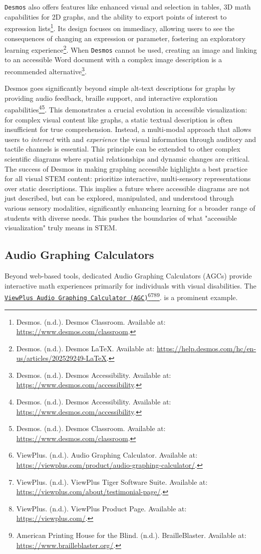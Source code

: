 \texttt{Desmos} also offers features like enhanced visual and selection in tables, 3D math capabilities for 2D graphs, and the ability to export points of interest to expression lists\footnote{Desmos. (n.d.). Desmos Classroom. Available at: \url{https://www.desmos.com/classroom}.}. Its design focuses on immediacy, allowing users to see the consequences of changing an expression or parameter, fostering an exploratory learning experience\footnote{Desmos. (n.d.). Desmos LaTeX. Available at: \url{https://help.desmos.com/hc/en-us/articles/202529249-LaTeX}.}. When \texttt{Desmos} cannot be used, creating an image and linking to an accessible Word document with a complex image description is a recommended alternative\footnote{Desmos. (n.d.). Desmos Accessibility. Available at: \url{https://www.desmos.com/accessibility}.}.

Desmos goes significantly beyond simple alt-text descriptions for graphs by providing audio feedback, braille support, and interactive exploration capabilities\footnote{Desmos. (n.d.). Desmos Accessibility. Available at: \url{https://www.desmos.com/accessibility}.}\footnote{Desmos. (n.d.). Desmos Classroom. Available at: \url{https://www.desmos.com/classroom}.}. This demonstrates a crucial evolution in accessible visualization: for complex visual content like graphs, a static textual description is often insufficient for true comprehension. Instead, a multi-modal approach that allows users to \textit{interact} with and \textit{experience} the visual information through auditory and tactile channels is essential. This principle can be extended to other complex scientific diagrams where spatial relationships and dynamic changes are critical. The success of Desmos in making graphing accessible highlights a best practice for all visual STEM content: prioritize interactive, multi-sensory representations over static descriptions. This implies a future where accessible diagrams are not just described, but can be explored, manipulated, and understood through various sensory modalities, significantly enhancing learning for a broader range of students with diverse needs. This pushes the boundaries of what "accessible visualization" truly means in STEM.

\subsection{Audio Graphing Calculators}
Beyond web-based tools, dedicated Audio Graphing Calculators (AGCs) provide interactive math experiences primarily for individuals with visual disabilities. The \href{https://viewplus.com/product/audio-graphing-calculator/}{\texttt{ViewPlus Audio Graphing Calculator (AGC)}}\footnote{ViewPlus. (n.d.). Audio Graphing Calculator. Available at: \url{https://viewplus.com/product/audio-graphing-calculator/}.}\footnote{ViewPlus. (n.d.). ViewPlus Tiger Software Suite. Available at: \url{https://viewplus.com/about/testimonial-page/}.}\footnote{ViewPlus. (n.d.). ViewPlus Product Page. Available at: \url{https://viewplus.com/}.}\footnote{American Printing House for the Blind. (n.d.). BrailleBlaster. Available at: \url{https://www.brailleblaster.org/}.}. is a prominent example.


